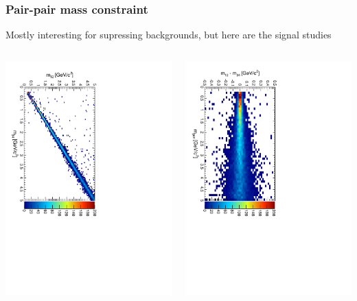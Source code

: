 \documentclass[compress]{beamer}
\begin{document}
\begin{frame}
\frametitle{Pair-pair mass constraint}

Mostly interesting for supressing backgrounds, but here are the signal studies

\begin{columns}
\includegraphics[height=\linewidth, angle=90]{m12m34.pdf}

\includegraphics[height=\linewidth, angle=90]{mdiff_vs_mass.pdf}


\end{columns}
\end{frame}
\end{document}
